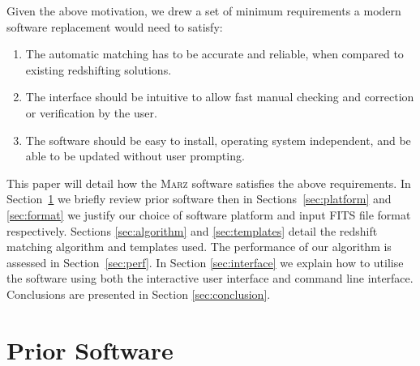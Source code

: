 \documentclass[5p]{elsarticle}
\newcommand{\marz}{\textsc{Marz}}
\begin{document}
Given the above motivation, we drew a set of minimum requirements a modern software replacement would need to satisfy:
\begin{enumerate}
\item The automatic matching has to be accurate and reliable, when compared to existing redshifting solutions.
\item The interface should be intuitive to allow fast manual checking and correction or verification by the user.
\item The software should be easy to install, operating system independent, and be able to be updated without user prompting.
\end{enumerate}
This paper will detail how the \marz{} software satisfies the above requirements. In Section~\ref{sec:prior} we briefly review prior software then in Sections~\ref{sec:platform} and \ref{sec:format} we justify our choice of software platform and input FITS file format respectively. Sections \ref{sec:algorithm} and \ref{sec:templates} detail the redshift matching algorithm and templates used.  The performance of our algorithm is assessed in Section~\ref{sec:perf}. In Section \ref{sec:interface} we explain how to utilise the software using both the interactive user interface and command line interface. Conclusions are presented in Section \ref{sec:conclusion}.

\section{Prior Software} \label{sec:prior}
\end{document}
